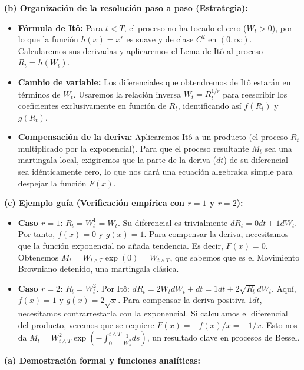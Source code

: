 \documentclass[11pt, letterpaper]{article}
\begin{document}
\begin{solucion}
    \textbf{(b) Organización de la resolución paso a paso (Estrategia):}
    \begin{itemize}
        \item[(i)] \textbf{Fórmula de Itô:} Para $t < T$, el proceso no ha tocado el cero ($W_t > 0$), por lo que la función $h(x) = x^r$ es suave y de clase $C^2$ en $(0, \infty)$. Calcularemos sus derivadas y aplicaremos el Lema de Itô al proceso $R_t = h(W_t)$.
        \item[(ii)] \textbf{Cambio de variable:} Los diferenciales que obtendremos de Itô estarán en términos de $W_t$. Usaremos la relación inversa $W_t = R_t^{1/r}$ para reescribir los coeficientes exclusivamente en función de $R_t$, identificando así $f(R_t)$ y $g(R_t)$.
        \item[(iii)] \textbf{Compensación de la deriva:} Aplicaremos Itô a un producto (el proceso $R_t$ multiplicado por la exponencial). Para que el proceso resultante $M_t$ sea una martingala local, exigiremos que la parte de la deriva ($dt$) de su diferencial sea idénticamente cero, lo que nos dará una ecuación algebraica simple para despejar la función $F(x)$.
    \end{itemize}

    \vspace{3mm}
    \textbf{(c) Ejemplo guía (Verificación empírica con $r=1$ y $r=2$):}
    \begin{itemize}
        \item \textbf{Caso $r=1$:} $R_t = W_t^1 = W_t$. Su diferencial es trivialmente $dR_t = 0 dt + 1 dW_t$. Por tanto, $f(x) = 0$ y $g(x) = 1$. 
        Para compensar la deriva, necesitamos que la función exponencial no añada tendencia. Es decir, $F(x) = 0$. Obtenemos $M_t = W_{t \wedge T} \exp(0) = W_{t \wedge T}$, que sabemos que es el Movimiento Browniano detenido, una martingala clásica.
        \item \textbf{Caso $r=2$:} $R_t = W_t^2$. Por Itô: $dR_t = 2W_t dW_t + dt = 1 dt + 2\sqrt{R_t} dW_t$.
        Aquí, $f(x) = 1$ y $g(x) = 2\sqrt{x}$. Para compensar la deriva positiva $1dt$, necesitamos contrarrestarla con la exponencial. Si calculamos el diferencial del producto, veremos que se requiere $F(x) = -f(x)/x = -1/x$. 
        Esto nos da $M_t = W_{t \wedge T}^2 \exp\left(-\int_0^{t \wedge T} \frac{1}{W_s^2} ds\right)$, un resultado clave en procesos de Bessel.
    \end{itemize}

    \vspace{3mm}
    \textbf{(a) Demostración formal y funciones analíticas:}


\end{solucion}
\end{document}
